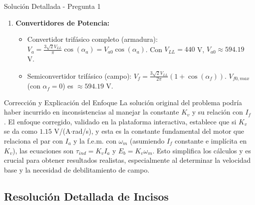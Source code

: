 \documentclass[12pt]{article}
\begin{document}
\begin{solutionbox}{Solución Detallada - Pregunta 1}
\begin{enumerate}
    \item \textbf{Convertidores de Potencia:}
    \begin{itemize}
        \item Convertidor trifásico completo (armadura): $V_a = \frac{3\sqrt{2}V_{LL}}{\pi}\cos(\alpha_a) = V_{a0}\cos(\alpha_a)$. Con $V_{LL} = 440$ V, $V_{a0} \approx 594.19$ V.
        \item Semiconvertidor trifásico (campo): $V_f = \frac{3\sqrt{2}V_{LL}}{2\pi}(1 + \cos(\alpha_f))$. $V_{f0,max}$ (con $\alpha_f=0$) es $\approx 594.19$ V.
    \end{itemize}
\end{enumerate}

\begin{importantnote}{Corrección y Explicación del Enfoque}
La solución original del problema podría haber incurrido en inconsistencias al manejar la constante $K_v$ y su relación con $I_f$. El enfoque corregido, validado en la plataforma interactiva, establece que si $K_v$ se da como $1.15$ V/(A$\cdot$rad/s), y esta es la constante fundamental del motor que relaciona el par con $I_a$ y la f.e.m. con $\omega_m$ (asumiendo $I_f$ constante e implícita en $K_v$), las ecuaciones son $\tau_{ind} = K_v I_a$ y $E_b = K_v \omega_m$. Esto simplifica los cálculos y es crucial para obtener resultados realistas, especialmente al determinar la velocidad base y la necesidad de debilitamiento de campo.
\end{importantnote}

\subsection*{Resolución Detallada de Incisos}


\end{solutionbox}
\end{document}

